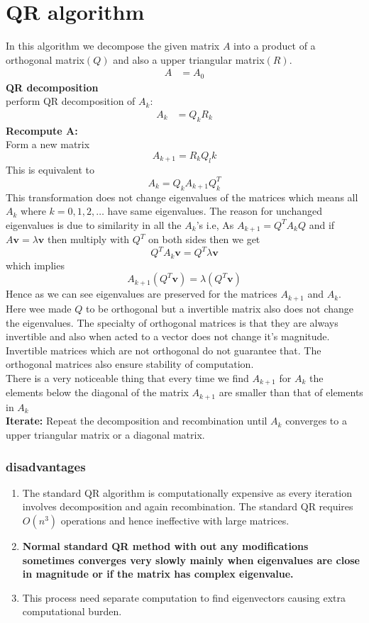 \documentclass[a4paper,12pt]{article}
\begin{document}
\section{QR algorithm}
In this algorithm we decompose the given matrix $A$ into a product of a orthogonal matrix$(Q)$ and also a upper triangular matrix$(R)$. 
\begin{align}
    A&=A_0
\end{align}
\textbf{QR decomposition} \\
perform QR decomposition of $A_k$:\\
\begin{align}
    A_k&=Q_k R_k
\end{align}
\textbf{Recompute A:}\\
Form a new matrix 
    $$A_{k+1}=R_kQ_lk$$
This is equivalent to $$A_k=Q_kA_{k+1}Q_k^T$$
This transformation does not change eigenvalues of the matrices which means all $A_k$ where $k=0,1,2,\ldots$ have same eigenvalues. The reason for unchanged eigenvalues is due to similarity in all the $A_k$'s i.e, As $A_{k+1}=Q^TA_kQ$ and if $A\textbf{v}=\lambda \textbf{v}$ then multiply with $Q^T$ on both sides then we get $$Q^TA_k\textbf{v}=Q^T\lambda \textbf{v}$$ which implies $$A_{k+1}(Q^T\textbf{v})=\lambda (Q^T\textbf{v})$$
Hence as we can see eigenvalues are preserved for the matrices $A_{k+1}$ and $A_k$. Here wee made $Q$ to be orthogonal but a invertible matrix also does not change the eigenvalues. The specialty of orthogonal matrices is that they are always invertible and also when acted to a vector does not change it's magnitude. Invertible matrices which are not orthogonal do not guarantee that. The orthogonal matrices also ensure stability of computation. \\
There is a very noticeable thing that every time we find $A_{k+1}$ for $A_k$ the elements below the diagonal of the matrix $A_{k+1} $ are smaller than that of elements in $A_k$\\

\vspace{1cm}
\textbf{Iterate:}
Repeat the decomposition and recombination until $A_k$ converges to a upper triangular matrix or a diagonal matrix. 
 
\subsubsection{disadvantages}
\begin{enumerate}
    \item The standard QR algorithm is computationally expensive as every iteration involves decomposition and again recombination. The standard QR requires $O\left(n^3\right)$ operations and hence ineffective with large matrices.
    \item \textbf{Normal standard QR method with out any modifications sometimes converges very slowly mainly when eigenvalues are close in magnitude or if the matrix has complex eigenvalue.}
    \item This process need separate computation to find eigenvectors causing extra computational burden.
    
\end{enumerate}
\end{document}
